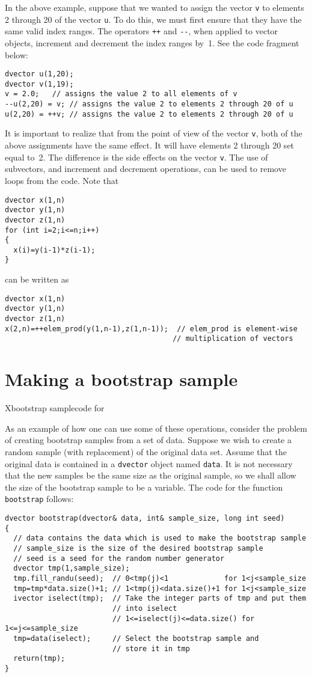 \documentclass{admbmanual}
\begin{document}
In the above example, suppose that we wanted to assign the vector \texttt{v}
to elements 2 through 20 of the vector \texttt{u}. To do this, we must first ensure that
they have the same valid index ranges. The operators \texttt{++} and \texttt{-{}-}, when applied to vector objects,
increment and decrement the index ranges by~1. See the code fragment below:
\begin{lstlisting}
dvector u(1,20);
dvector v(1,19);
v = 2.0;   // assigns the value 2 to all elements of v
--u(2,20) = v; // assigns the value 2 to elements 2 through 20 of u
u(2,20) = ++v; // assigns the value 2 to elements 2 through 20 of u
\end{lstlisting}
It is important to realize that from the point of view of the vector
\texttt{v}, both of the above assignments have the same effect. It will have
elements 2 through 20 set equal to~2. The difference is the side
effects on the vector \texttt{v}. The use of subvectors, and increment and decrement
operations, can be used to remove loops from the code. Note that
\begin{lstlisting}
dvector x(1,n)
dvector y(1,n)
dvector z(1,n)
for (int i=2;i<=n;i++)
{
  x(i)=y(i-1)*z(i-1);
}
\end{lstlisting}
can be written as
\begin{lstlisting}
dvector x(1,n)
dvector y(1,n)
dvector z(1,n)
x(2,n)=++elem_prod(y(1,n-1),z(1,n-1));  // elem_prod is element-wise 
                                       // multiplication of vectors
\end{lstlisting}

 
\section{Making a bootstrap sample}
X{bootstrap sample}{code for}

As an example of how one can use some of these operations, consider the
problem of creating bootstrap samples from a set of data. 
Suppose we wish to create a random sample (with replacement) of the original data set.
Assume that the original data is contained in a \texttt{dvector} object
named \texttt{data}.
It is not necessary that the new samples be the same size as the original
sample, so we shall allow the size of the bootstrap sample to be 
a variable. The code for the function \texttt{bootstrap} follows:
\begin{lstlisting}
dvector bootstrap(dvector& data, int& sample_size, long int seed)
{
  // data contains the data which is used to make the bootstrap sample
  // sample_size is the size of the desired bootstrap sample
  // seed is a seed for the random number generator 
  dvector tmp(1,sample_size);
  tmp.fill_randu(seed);  // 0<tmp(j)<1             for 1<j<sample_size
  tmp=tmp*data.size()+1; // 1<tmp(j)<data.size()+1 for 1<j<sample_size
  ivector iselect(tmp);  // Take the integer parts of tmp and put them
                         // into iselect
                         // 1<=iselect(j)<=data.size() for 1<=j<=sample_size
  tmp=data(iselect);     // Select the bootstrap sample and
                         // store it in tmp
  return(tmp);
} 
\end{lstlisting}
\end{document}
